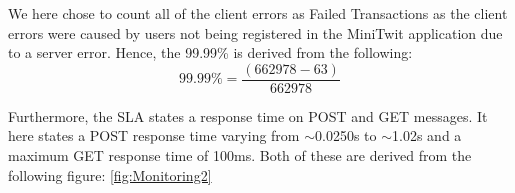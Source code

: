 \noindent
We here chose to count all of the client errors as Failed Transactions as the client errors were caused by users not being registered in the MiniTwit application due to a server error. Hence, the 99.99\% is derived from the following:
\[
    99.99\% = \frac{(662978 - 63)}{662978}
\]

\noindent
Furthermore, the SLA states a response time on POST and GET messages. It here states a POST response time varying from $\sim$0.0250s to $\sim$1.02s and a maximum GET response time of 100ms. Both of these are derived from the following figure: \ref{fig:Monitoring2}